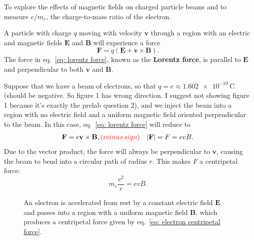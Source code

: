\documentclass[addpoints]{physlabs}
\begin{document}
\begin{labsection}

\begin{objective}
    To explore the effects of magnetic fields on charged particle beams and to measure $e/m_e$, the charge-to-mass ratio of the electron.
\end{objective}

\begin{theory} 

    A particle with charge $q$ moving with velocity $\mathbf{v}$ through a region with an electric and magnetic fields $\mathbf{E}$ and $\mathbf{B}$ will experience a force
    \begin{equation}\label{eq: lorentz force}
        \mathbf{F} = q(\mathbf{E} + \mathbf{v}\times\mathbf{B}).
    \end{equation}
    The force in eq.~\ref{eq: lorentz force}, known as the \textbf{Lorentz force}, is parallel to $\mathbf{E}$ and perpendicular to both $\mathbf{v}$ and $\mathbf{B}$.

    Suppose that we have a beam of electrons, so that $q=e\approx\qty{1.602e-19}{\coulomb}${\color{red} (should be negative. So figure 1 has wrong direction. I suggest not showing figure 1 because it's exactly the prelab question 2)}, and we inject the beam into a region with no electric field and a uniform magnetic field oriented perpendicular to the beam. In this case, eq.~\ref{eq: lorentz force} will reduce to
    \begin{align}\label{eq: evB force}
        \mathbf{F} &= e\mathbf{v}\times\mathbf{B}, {\color{red} (minus\,sign)}
        &
        |\mathbf{F}| = F = evB.
    \end{align}
    Due to the vector product, the force will always be perpendicular to $\mathbf{v}$, causing the beam to bend into a circular path of radius $r$. This makes $F$ a centripetal force:
    \begin{equation}\label{eq: electron centripetal force}
        m_e\frac{v^2}{r} = evB.
    \end{equation}

    \begin{figure}[ht]
        \centering
        
        \caption{An electron is accelerated from rest by a constant electric field $\mathbf{E}$ and passes into a region with a uniform magnetic field $\mathbf{B}$, which produces a centripetal force given by eq.~\ref{eq: electron centripetal force}.}
        \label{fig: e beam deflection}
    \end{figure}


\end{theory}
\end{labsection}
\end{document}
